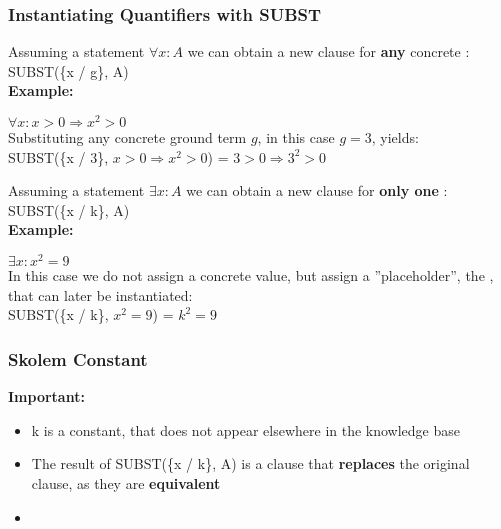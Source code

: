 \documentclass[
../../EiKI_Summary.tex,
]
{subfiles}
\begin{document}
\subsubsection{Instantiating Quantifiers with SUBST}
\begin{minipage}
    [t]{0.5\textwidth}
    \begin{defbox}
        Assuming a statement $\forall x: A$ we can obtain a new clause for \textbf{any} concrete :\\
        SUBST(\{x / g\}, A)\\

        \textbf{Example:}\\
        \begin{center}
            $\forall x: x > 0 \Rightarrow x^2 > 0$\\
            Substituting any concrete ground term $g$, in this case $g = 3$, yields:\\
            SUBST(\{x / 3\}, $x > 0 \Rightarrow x^2 > 0$) = $3 > 0 \Rightarrow 3^2 > 0$\\
        \end{center}
    \end{defbox}
\end{minipage}
\begin{minipage}
    [t]{0.5\textwidth}
    \begin{defbox}
        Assuming a statement $\exists x: A$ we can obtain a new clause for \textbf{only one} :\\
        SUBST(\{x / k\}, A)\\

        \textbf{Example:}\\
        \begin{center}
            $\exists x: x^2 = 9$\\
            In this case we do not assign a concrete value, but assign a ''placeholder'', the , that can later be instantiated:\\
            SUBST(\{x / k\}, $x^2 = 9$) = $k^2 = 9$
        \end{center}
    \end{defbox}
\end{minipage}

\subsubsection*{Skolem Constant}
\textbf{Important:}
\begin{itemize}
    \item k is a constant, that does not appear elsewhere in the knowledge base
    \item The result of SUBST(\{x / k\}, A) is a clause that \textbf{replaces} the original clause, as they are \textbf{equivalent}
    \item 
\end{itemize}
\end{document}
